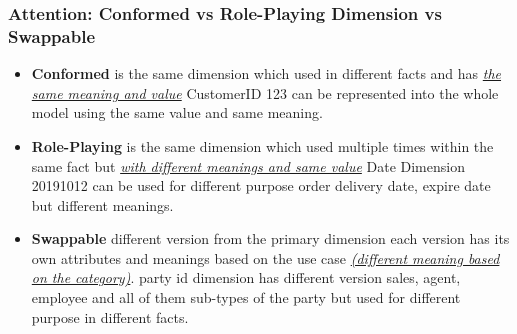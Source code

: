 \begin{frame}
\frametitle{Attention: Conformed vs Role-Playing Dimension vs Swappable}
	\begin{itemize}[<+->]
		\item \textbf{Conformed} is the same dimension which used in different facts and has \textit{\underline{the same meaning and value}} \forexample CustomerID 123 can be represented into the whole model using the same value and same meaning.
		\item \textbf{Role-Playing} is the same dimension which used multiple times within the same fact but \textit{\underline{with different meanings and same value}} \forexample Date Dimension 20191012 can be used for different purpose order delivery date, expire date but different meanings.
		\item \textbf{Swappable} different version from the primary dimension each version has its own attributes and meanings based on the use case \textit{\underline{(different meaning based on the category)}}. \forexample party id dimension has different version sales, agent, employee and all of them sub-types of the party but used for different purpose in different facts.
	\end{itemize}

\end{frame}

